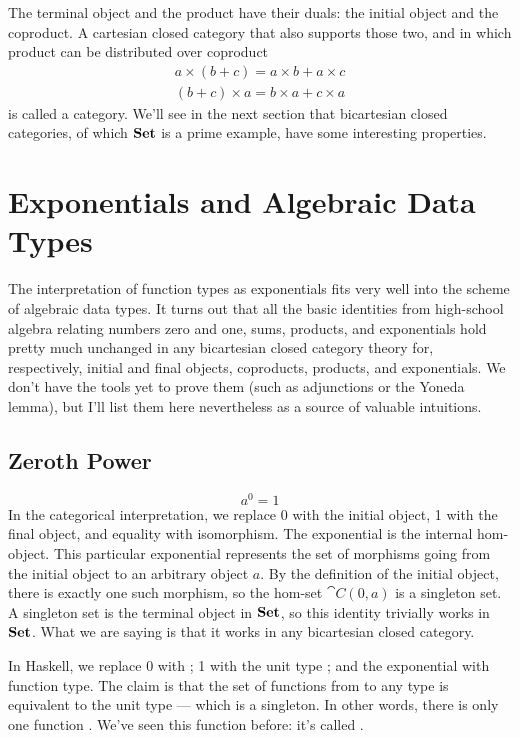 The terminal object and the product have their duals: the initial object
and the coproduct. A cartesian closed category that also supports those
two, and in which product can be distributed over coproduct
\begin{gather*}
a \times (b + c) = a \times b + a \times c \\
(b + c) \times a = b \times a + c \times a
\end{gather*}
is called a  category. We'll see in the next
section that bicartesian closed categories, of which $\mathbf{Set}$ is a
prime example, have some interesting properties.

\section{Exponentials and Algebraic Data
Types}\label{exponentials-and-algebraic-data-types}

The interpretation of function types as exponentials fits very well into
the scheme of algebraic data types. It turns out that all the basic
identities from high-school algebra relating numbers zero and one, sums,
products, and exponentials hold pretty much unchanged in any bicartesian
closed category theory for, respectively, initial and final objects,
coproducts, products, and exponentials. We don't have the tools yet to
prove them (such as adjunctions or the Yoneda lemma), but I'll list them
here nevertheless as a source of valuable intuitions.

\subsection{Zeroth Power}\label{zeroth-power}

\[a^{0} = 1\]
In the categorical interpretation, we replace 0 with the initial object,
1 with the final object, and equality with isomorphism. The exponential
is the internal hom-object. This particular exponential represents the
set of morphisms going from the initial object to an arbitrary object
$a$. By the definition of the initial object, there is exactly
one such morphism, so the hom-set $\cat{C}(0, a)$ is a singleton set. A
singleton set is the terminal object in $\mathbf{Set}$, so this identity
trivially works in $\mathbf{Set}$. What we are saying is that it works in
any bicartesian closed category.

In Haskell, we replace 0 with ; 1 with the unit type
\code{()}; and the exponential with function type. The claim is that
the set of functions from  to any type  is
equivalent to the unit type --- which is a singleton. In other words,
there is only one function . We've seen
this function before: it's called .

